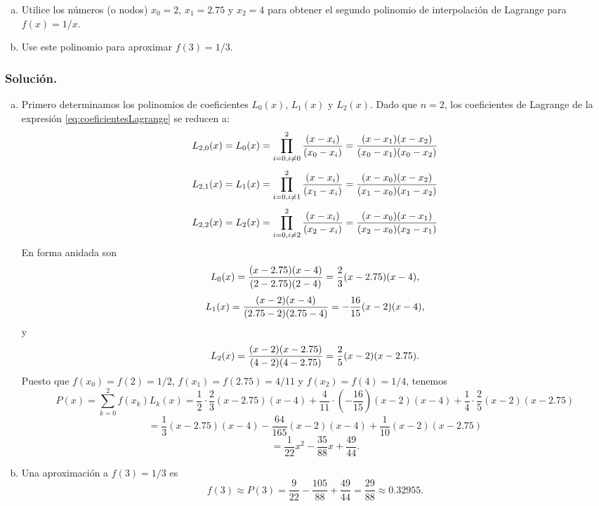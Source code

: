 \begin{exerciseT}
		\begin{enumerate}[a)]
			\item Utilice los números (o nodos) $x_0 = 2$, $x_1 = 2.75$ y $x_2 = 4$ para obtener el segundo polinomio de interpolación de 
				Lagrange para $f(x) = 1/x$.
			\item Use este polinomio para aproximar $f(3) = 1/3$.
		\end{enumerate}
		\subsubsection*{Solución.}
		\begin{enumerate}[a)]
			\item Primero determinamos los polinomios de coeficientes $L_0(x)$, $L_1(x)$ y $L_2(x)$. 
				Dado que $n=2$, los coeficientes de Lagrange de la expresión \ref{eq:coeficientesLagrange} se reducen a:
				$$L_{2,0}(x) = L_0(x) = \prod_{i=0, i\not= 0}^{2} {(x-x_i) \over (x_0 - x_i)} = {(x-x_1)(x-x_2)\over (x_0-x_1)(x_0-x_2)}$$	
				$$L_{2,1}(x) = L_1(x) = \prod_{i=0, i\not= 1}^{2} {(x-x_i) \over (x_1 - x_i)} = {(x-x_0)(x-x_2)\over (x_1-x_0)(x_1-x_2)}$$	
				$$L_{2,2}(x) = L_2(x) = \prod_{i=0, i\not= 2}^{2} {(x-x_i) \over (x_2 - x_i)} = {(x-x_0)(x-x_1)\over (x_2-x_0)(x_2-x_1)}$$	
				En forma anidada son
				$$L_0(x) = {(x-2.75)(x-4)\over (2-2.75)(2-4)} = \frac{2}{3}(x-2.75)(x-4),$$
				$$L_1(x) = {(x-2)(x-4)\over (2.75-2)(2.75-4)} = -\frac{16}{15}(x-2)(x-4),$$
				y
				$$L_2(x) = {(x-2)(x-2.75)\over (4-2)(4-2.75)} = \frac{2}{5}(x-2)(x-2.75).$$		
				Puesto que $f(x_0) = f(2) = 1/2$, $f(x_1) = f(2.75) = 4/11$ y $f(x_2) = f(4) = 1/4$, tenemos
				$$P(x) = \sum_{k=0}^2 f(x_k)L_k(x) =  \frac{1}{2}\cdot\frac{2}{3}(x-2.75)(x-4) + \frac{4}{11}\cdot\left(-\frac{16}{15}\right)(x-2)(x-4) + 
				\frac{1}{4}\cdot\frac{2}{5}(x-2)(x-2.75) $$
				$$ = \frac{1}{3}(x-2.75)(x-4) - \frac{64}{165}(x-2)(x-4) + \frac{1}{10}(x-2)(x-2.75)$$
				$$ = \frac{1}{22}x^2 - \frac{35}{88}x + \frac{49}{44}.$$
			\item Una aproximación a $f(3) = 1/3$ es
				$$f(3) \approx P(3) = \frac{9}{22} - \frac{105}{88} + \frac{49}{44} = \frac{29}{88} \approx 0.32955.$$
		\end{enumerate}
\end{exerciseT}


